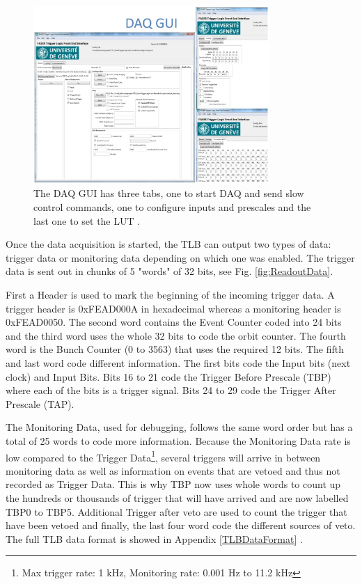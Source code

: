 \begin{figure}[htbp!] 
\centering    
\includegraphics[width=0.8\textwidth]{ChapterDAQ/Figs/GeneralDAQ/DAQGui.jpg}
\caption[DAQ GUI]{The DAQ GUI has three tabs, one to start DAQ and send slow control commands, one to configure inputs and prescales and the last one to set the LUT \cite{debieux_faser_2019}.}
\label{fig:DAQGui}
\end{figure}

Once the data acquisition is started, the TLB can output two types of data: trigger data or monitoring data depending on which one was enabled. The trigger data is sent out in chunks  of 5 "words" of 32 bits, see Fig. \ref{fig:ReadoutData}.

First a Header is used to mark the beginning of the incoming trigger data. A trigger header is 0xFEAD000A in hexadecimal whereas a monitoring header is 0xFEAD0050. The second word contains the Event Counter coded into 24 bits and the third word uses the whole 32 bits to code the orbit counter. The fourth word is the Bunch Counter (0 to 3563) that uses the required 12 bits. The fifth and last word code different information. The first bits code the Input bits (next clock) and Input Bits. Bits 16 to 21 code the Trigger Before Prescale (TBP) where each of the bits is a trigger signal. Bits 24 to 29 code the Trigger After Prescale (TAP).

The Monitoring Data, used for debugging, follows the same word order but has a total of 25 words to code more information. Because the Monitoring Data rate is low compared to the Trigger Data\footnote{Max trigger rate: 1 kHz, Monitoring rate: 0.001 Hz to 11.2 kHz}, several triggers will arrive in between monitoring data as well as information on events that are vetoed and thus not recorded as Trigger Data. This is why TBP now uses whole words to count up the hundreds or thousands of trigger that will have arrived and are now labelled TBP0 to TBP5. Additional Trigger after veto are used to count the trigger that have been vetoed and finally, the last four word code the different sources of veto. The full TLB data format is showed in Appendix \ref{TLBDataFormat} .


